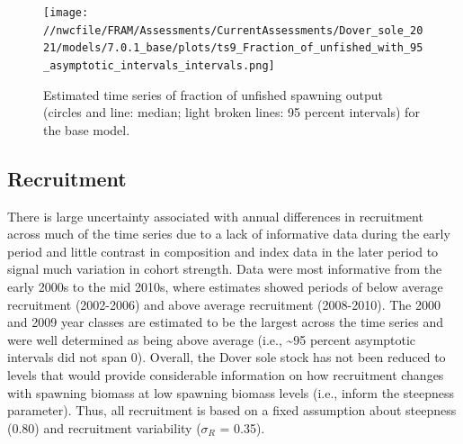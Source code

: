\documentclass[11pt,
  english,
  a4paper,
]{article}
\begin{document}
\tagmcend\tagstructend


\begin{figure}
\centering
\texttt{[image: //nwcfile/FRAM/Assessments/CurrentAssessments/Dover\_sole\_2021/models/7.0.1\_base/plots/ts9\_Fraction\_of\_unfished\_with\_95\_asymptotic\_intervals\_intervals.png]}
\caption{Estimated time series of fraction of unfished spawning output (circles and line: median; light broken lines: 95 percent intervals) for the base model.\label{fig:es-depl}}
\end{figure}

\tagmcend\tagstructend

\clearpage


\hypertarget{recruitment}{%
\subsection*{Recruitment}\label{recruitment}}

\leavevmode\tagmcend\tagstructend


There is large uncertainty associated with annual differences in recruitment across much of the time series due to a lack of informative data during the early period and little contrast in composition and index data in the later period to signal much variation in cohort strength. Data were most informative from the early 2000s to the mid 2010s, where estimates showed periods of below average recruitment (2002-2006) and above average recruitment (2008-2010). The 2000 and 2009 year classes are estimated to be the largest across the time series and were well determined as being above average (i.e., \textasciitilde95 percent asymptotic intervals did not span 0). Overall, the Dover sole stock has not been reduced to levels that would provide considerable information on how recruitment changes with spawning biomass at low spawning biomass levels (i.e., inform the steepness parameter). Thus, all recruitment is based on a fixed assumption about steepness (0.80) and recruitment variability ({\(\sigma_R\)\leavevmode\tagmcend\tagstructend} = 0.35).
\end{document}
